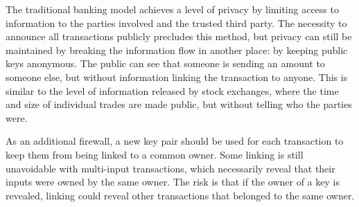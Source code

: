 The traditional banking model achieves a level of privacy by limiting access to information to the parties involved and the trusted third party. The necessity to announce all transactions publicly precludes this method, but privacy can still be maintained by breaking the information flow in another place: by keeping public keys anonymous. The public can see that someone is sending an amount to someone else, but without information linking the transaction to anyone. This is similar to the level of information released by stock exchanges, where the time and size of individual trades are made public, but without telling who the parties were.

As an additional firewall, a new key pair should be used for each transaction to keep them from being linked to a common owner. Some linking is still unavoidable with multi-input transactions, which necessarily reveal that their inputs were owned by the same owner. The risk is that if the owner of a key is revealed, linking could reveal other transactions that belonged to the same owner.
